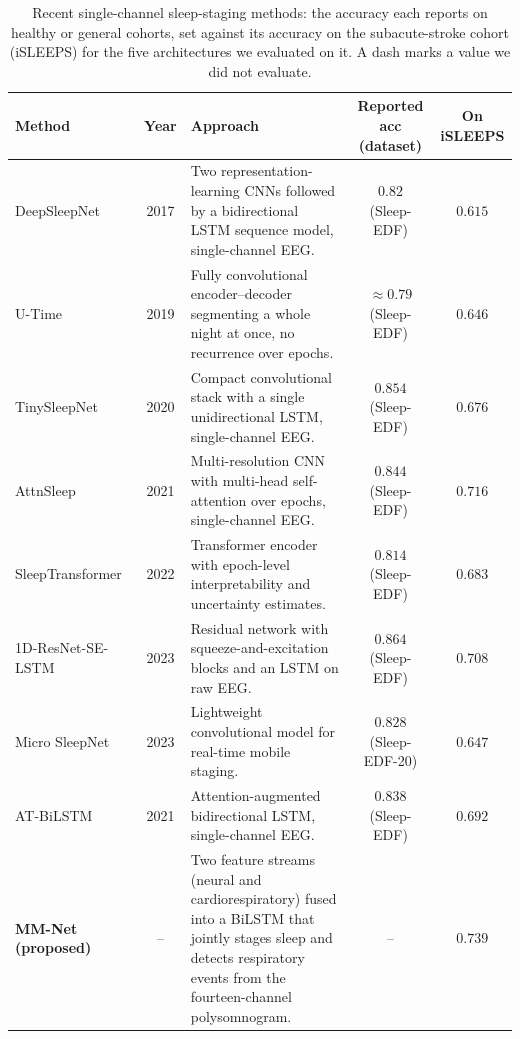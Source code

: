 \documentclass{ieeeaccess}
\begin{document}
\begin{table}[t]
\caption{Recent single-channel sleep-staging methods: the accuracy each reports on healthy or
general cohorts, set against its accuracy on the subacute-stroke cohort (iSLEEPS) for the five
architectures we evaluated on it. A dash marks a value we did not evaluate.}
\label{tab:litreview}
\centering
\small
\begin{tabular*}{\textwidth}{@{\extracolsep{\fill}} l c p{7.2cm} c c @{}}
\toprule
Method & Year & Approach & Reported acc (dataset) & On iSLEEPS \\
\midrule
DeepSleepNet~\cite{supratak2017deepsleepnet} & 2017 & Two representation-learning CNNs followed by a bidirectional LSTM sequence model, single-channel EEG. & $0.82$ (Sleep-EDF) & $0.615$ \\
U-Time~\cite{perslev2019utime} & 2019 & Fully convolutional encoder--decoder segmenting a whole night at once, no recurrence over epochs. & $\approx$$0.79$ (Sleep-EDF) & $0.646$ \\
TinySleepNet~\cite{supratak2020tinysleepnet} & 2020 & Compact convolutional stack with a single unidirectional LSTM, single-channel EEG. & $0.854$ (Sleep-EDF) & $0.676$ \\
AttnSleep~\cite{eldele2021attnsleep} & 2021 & Multi-resolution CNN with multi-head self-attention over epochs, single-channel EEG. & $0.844$ (Sleep-EDF) & $0.716$ \\
SleepTransformer~\cite{sleeptransformer2022} & 2022 & Transformer encoder with epoch-level interpretability and uncertainty estimates. & $0.814$ (Sleep-EDF) & $0.683$ \\
1D-ResNet-SE-LSTM~\cite{li2023resnetselstm} & 2023 & Residual network with squeeze-and-excitation blocks and an LSTM on raw EEG. & $0.864$ (Sleep-EDF) & $0.708$ \\
Micro SleepNet~\cite{liu2023microsleepnet} & 2023 & Lightweight convolutional model for real-time mobile staging. & $0.828$ (Sleep-EDF-20) & $0.647$ \\
AT-BiLSTM~\cite{fu2021atbilstm} & 2021 & Attention-augmented bidirectional LSTM, single-channel EEG. & $0.838$ (Sleep-EDF) & $0.692$ \\
\midrule
\textbf{MM-Net (proposed)} & -- & Two feature streams (neural and cardiorespiratory) fused into a BiLSTM that jointly stages sleep and detects respiratory events from the fourteen-channel polysomnogram. & -- & $\mathbf{0.739}$ \\
\bottomrule
\end{tabular*}
\end{table}
\end{document}

